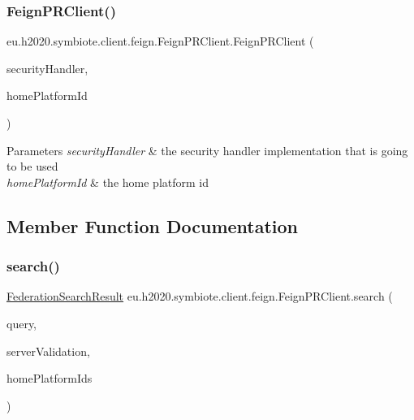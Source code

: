 \subsubsection{\texorpdfstring{Feign\+P\+R\+Client()}{FeignPRClient()}}
{\footnotesize\ttfamily eu.\+h2020.\+symbiote.\+client.\+feign.\+Feign\+P\+R\+Client.\+Feign\+P\+R\+Client (\begin{DoxyParamCaption}\item[{I\+Security\+Handler}]{security\+Handler,  }\item[{String}]{home\+Platform\+Id }\end{DoxyParamCaption})}


\begin{DoxyParams}{Parameters}
{\em security\+Handler} & the security handler implementation that is going to be used \\
\hline
{\em home\+Platform\+Id} & the home platform id \\
\hline
\end{DoxyParams}


\subsection{Member Function Documentation}
\mbox{\label{classeu_1_1h2020_1_1symbiote_1_1client_1_1feign_1_1FeignPRClient_ab649b246e9d3a9f8d5908eb93615231f}} 
\subsubsection{\texorpdfstring{search()}{search()}}
{\footnotesize\ttfamily \hyperlink{classeu_1_1h2020_1_1symbiote_1_1cloud_1_1model_1_1internal_1_1FederationSearchResult}{Federation\+Search\+Result} eu.\+h2020.\+symbiote.\+client.\+feign.\+Feign\+P\+R\+Client.\+search (\begin{DoxyParamCaption}\item[{\hyperlink{classeu_1_1h2020_1_1symbiote_1_1cloud_1_1model_1_1internal_1_1PlatformRegistryQuery}{Platform\+Registry\+Query}}]{query,  }\item[{boolean}]{server\+Validation,  }\item[{Set$<$ String $>$}]{home\+Platform\+Ids }\end{DoxyParamCaption})}


